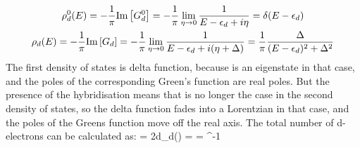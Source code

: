 \documentclass[12pt,twoside]{report}
\numberwithin{equation}{section}
\begin{document}
\begin{gather}
    \rho_d^0(E) = -\frac{1}{\pi}\text{Im}\left[{G^0_d}\right] = -\frac{1}{\pi} \lim_{\eta \rightarrow 0} \frac{1}{E - \epsilon_d + i\eta} = \delta(E - \epsilon_d)\\
    \rho_d(E) = -\frac{1}{\pi}\text{Im}\left[{G_d}\right]= -\frac{1}{\pi} \lim_{\eta \rightarrow 0} \frac{1}{E - \epsilon_d + i(\eta+\Delta)} = \frac{1}{\pi}\frac{\Delta}{(E-\epsilon_d)^2 + \Delta^2}\label{densitys}
\end{gather}
The first density of states is delta function, because  is an eigenstate in that case, and the poles of the corresponding Green's function are real poles.
But the presence of the hybridisation means that is no longer the case in the second density of states, so the delta function fades into a Lorentzian in that case, and the poles of the Greens function move off the real axis.
\pb The total number of d-electrons can be calculated as:
\beq[total]
 = 2\int d\epsilon \rho_d(\epsilon) = \fr{2\Delta}{\pi} \int {} = \cot^{-1}
\eeq
\end{document}
